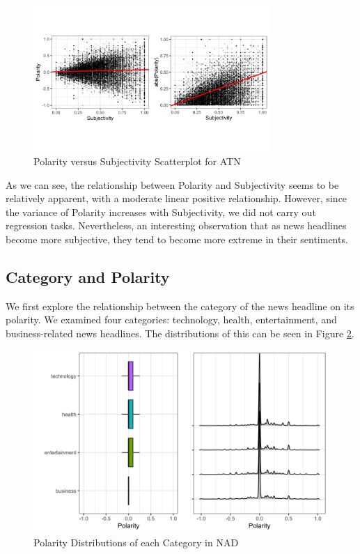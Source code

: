 \documentclass[12pt]{article}
\begin{document}
\begin{figure}[H]
    \centering
    \includegraphics[width=0.8\textwidth]{images/PolSub_ATN.png}
    \caption{Polarity versus Subjectivity Scatterplot for ATN}
    \label{fig:PolSub_ATN}
\end{figure}

As we can see, the relationship between Polarity and Subjectivity seems to be relatively apparent, with a moderate linear positive relationship. However, since the variance of Polarity increases with Subjectivity, we did not carry out regression tasks. Nevertheless, an interesting observation that as news headlines become more subjective, they tend to become more extreme in their sentiments.

\subsection{Category and Polarity}

We first explore the relationship between the category of the news headline on its polarity. We examined four categories: technology, health, entertainment, and business-related news headlines. The distributions of this can be seen in Figure \ref{fig:CatPol_Dist}.

\begin{figure}[H]
    \centering
    \includegraphics[width=1\textwidth]{images/CatPol_Dist.png}
    \caption{Polarity Distributions of each Category in NAD}
    \label{fig:CatPol_Dist}
\end{figure}
\end{document}
